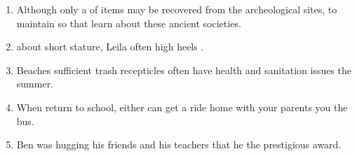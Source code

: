 \begin{enumerate}
\item \begin{inparaenum}[A]
Although only a  of items may be recovered from the archeological sites,  to maintain  so that learn about these ancient societies. 
\end{inparaenum}

\item \begin{inparaenum}[A]
 about  short stature, Leila often  high heels . 
\end{inparaenum}

\item \begin{inparaenum}[A]
Beaches  sufficient trash recepticles often  have  health and sanitation issues  the summer. 
\end{inparaenum}

\item \begin{inparaenum}[A]
When  return to school, either  can get a ride home with your parents  you  the bus. 
\end{inparaenum}

\item \begin{inparaenum}[A]
Ben was hugging his friends and  his teachers   that he  the prestigious award. 
\end{inparaenum}


\end{enumerate}
